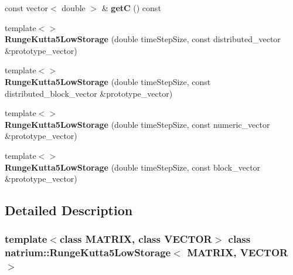\begin{DoxyCompactItemize}
\item 
\hypertarget{classnatrium_1_1RungeKutta5LowStorage_a0b747cec432de72544b82b5033eb8211}{
const vector$<$ double $>$ \& {\bfseries getC} () const }
\label{classnatrium_1_1RungeKutta5LowStorage_a0b747cec432de72544b82b5033eb8211}

\item 
\hypertarget{classnatrium_1_1RungeKutta5LowStorage_a226065b21bd5f8e3ae7566ba53e33d1e}{
{\footnotesize template$<$$>$ }\\{\bfseries RungeKutta5LowStorage} (double timeStepSize, const distributed\_\-vector \&prototype\_\-vector)}
\label{classnatrium_1_1RungeKutta5LowStorage_a226065b21bd5f8e3ae7566ba53e33d1e}

\item 
\hypertarget{classnatrium_1_1RungeKutta5LowStorage_ae5c62f8f59075a950ff25719e79d6fab}{
{\footnotesize template$<$$>$ }\\{\bfseries RungeKutta5LowStorage} (double timeStepSize, const distributed\_\-block\_\-vector \&prototype\_\-vector)}
\label{classnatrium_1_1RungeKutta5LowStorage_ae5c62f8f59075a950ff25719e79d6fab}

\item 
\hypertarget{classnatrium_1_1RungeKutta5LowStorage_a54a371cac7acd4b1ab73ddf7636fb60a}{
{\footnotesize template$<$$>$ }\\{\bfseries RungeKutta5LowStorage} (double timeStepSize, const numeric\_\-vector \&prototype\_\-vector)}
\label{classnatrium_1_1RungeKutta5LowStorage_a54a371cac7acd4b1ab73ddf7636fb60a}

\item 
\hypertarget{classnatrium_1_1RungeKutta5LowStorage_a5ab769a4a099dd65cb5c2ff9d13c7eab}{
{\footnotesize template$<$$>$ }\\{\bfseries RungeKutta5LowStorage} (double timeStepSize, const block\_\-vector \&prototype\_\-vector)}
\label{classnatrium_1_1RungeKutta5LowStorage_a5ab769a4a099dd65cb5c2ff9d13c7eab}

\end{DoxyCompactItemize}


\subsection{Detailed Description}
\subsubsection*{template$<$class MATRIX, class VECTOR$>$ class natrium::RungeKutta5LowStorage$<$ MATRIX, VECTOR $>$}


